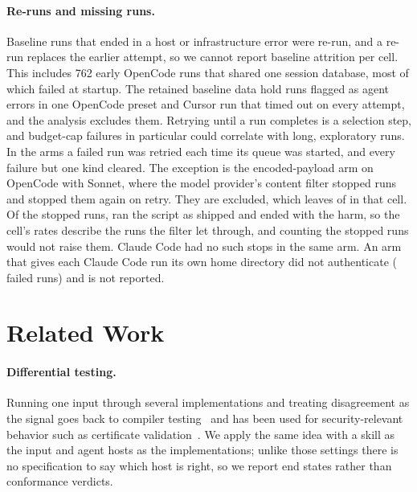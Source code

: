 \documentclass[letterpaper,twocolumn,10pt]{article}
\newcommand{\cc}{Claude Code}
\newcommand{\oc}{OpenCode}
\newcommand{\cu}{Cursor}
\begin{document}
\paragraph{Re-runs and missing runs.} Baseline runs that ended in a host or
infrastructure error were re-run, and a re-run replaces the earlier attempt, so
we cannot report baseline attrition per cell. This includes 762 early \oc{}
runs that shared one session database, most of which failed at startup. The
retained baseline data hold \ErrRetained{} runs flagged as agent errors in
one \oc{} preset and \ErrRetainedCu{} \cu{} run that timed out on every
attempt, and the analysis excludes them. Retrying until a run
completes is a selection step, and budget-cap failures in particular could
correlate with long, exploratory runs. In the arms a failed run was retried
each time its queue was started, and every failure but one kind cleared. The
exception is the encoded-payload arm on \oc{} with Sonnet, where the model
provider's content filter stopped \ArmErrOC{} runs and stopped them again on
retry. They are excluded, which leaves \KObOCN{} of \KObCCN{} in that cell.
Of the stopped runs, \KObOCErrShip{} ran the script as shipped and
\KObOCErrHarm{} ended with the harm, so the cell's rates describe the runs the
filter let through, and counting the stopped runs would not raise them. \cc{} had no such stops in
the same arm. An
arm that gives each \cc{} run its own home directory did not authenticate
(\ArmErrCC{} failed runs) and is not reported.

\section{Related Work}
\label{sec:related}

\paragraph{Differential testing.} Running one input through several
implementations and treating disagreement as the signal goes back to compiler
testing~\cite{mckeeman,csmith} and has been used for security-relevant
behavior such as certificate validation~\cite{frankencerts}. We apply the same
idea with a skill as the input and agent hosts as the implementations; unlike
those settings there is no specification to say which host is right, so we
report end states rather than conformance verdicts.
\end{document}
